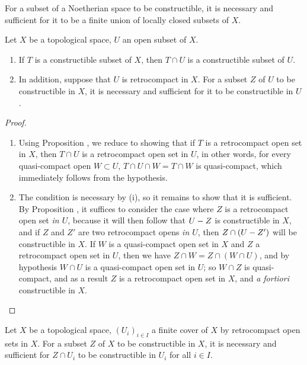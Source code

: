 \begin{cor}[9.1.7]
\label{0.9.1.7}
For a subset of a Noetherian space to be constructible, it is necessary and sufficient for it to be a finite union of locally closed subsets of $X$.
\end{cor}

\begin{prop}[9.1.8]
\label{0.9.1.8}
Let $X$ be a topological space, $U$ an open subset of $X$.
\begin{enumerate}[label=\emph{(\roman*)}]
  \item If $T$ is a constructible subset of $X$, then $T\cap U$ is a constructible subset of $U$.
  \item In addition, suppose that $U$ is retrocompact in $X$. For a subset $Z$ of $U$ to be constructible in $X$, it is necessary and sufficient for it to be constructible in $U$.
\end{enumerate}
\end{prop}

\begin{proof}
\label{proof-0.9.1.8}
\medskip\noindent
\begin{enumerate}[label=(\roman*)]
  \item Using Proposition , we reduce to showing that if $T$ is a retrocompact open set in $X$, then $T\cap U$ is a retrocompact open set in $U$, in other words, for every quasi-compact open $W\subset U$, $T\cap U\cap W=T\cap W$ is quasi-compact, which immediately follows from the hypothesis.
  \item The condition is necessary by (i), so it remains to show that it is sufficient.
    By Proposition , it suffices to consider the case where $Z$ is a retrocompact open set \emph{in $U$}, because it will then follow that $U- Z$ is constructible in $X$, and if $Z$ and $Z'$ are two retrocompact opens \emph{in $U$}, then $Z\cap(U- Z')$ will be constructible in $X$.
    If $W$ is a quasi-compact open set in $X$ and $Z$ a retrocompact open set in $U$, then we have $Z\cap W=Z\cap(W\cap U)$, and by hypothesis $W\cap U$ is a quasi-compact open set in $U$; so $W\cap Z$ is quasi-compact, and as a result $Z$ is a retrocompact open set in $X$, and \emph{a fortiori} constructible in $X$.
\end{enumerate}
\end{proof}

\begin{cor}[9.1.9]
\label{0.9.1.9}
Let $X$ be a topological space, $(U_i)_{i\in I}$ a finite cover of $X$ by retrocompact open sets in $X$.
For a subset $Z$ of $X$ to be constructible in $X$, it is necessary and sufficient for $Z\cap U_i$ to be constructible in $U_i$ for all $i\in I$.
\end{cor}

